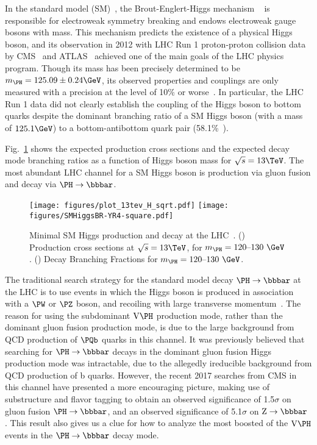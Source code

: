 
In the standard model (SM)~\cite{Salam:1961en,Glashow:1961tr,Weinberg:1967tq}, the Brout-Englert-Higgs mechanism ~\cite{PhysRevLett.13.321,PhysRevLett.13.508,PhysRevLett.13.585} is responsible for electroweak symmetry breaking and endows electroweak gauge bosons with mass. This mechanism predicts the existence of a physical Higgs boson, and its observation in 2012 with LHC Run 1 proton-proton collision data by CMS~\cite{:2012gu} and ATLAS~\cite{:2012gk} achieved one of the main goals of the LHC physics program. Though its mass has been precisely determined to be $m_\PH = 125.09 \pm 0.24 \GeV$, its observed properties and couplings are only measured with a precision at the level of 10\% or worse~\cite{CMS:2015kwa}. In particular, the LHC Run 1 data did not clearly establish the coupling of the Higgs boson to bottom quarks despite the dominant branching ratio of a SM Higgs boson (with a mass of $125.1\GeV$) to a bottom-antibottom quark pair (58.1\%~\cite{YR4}).

Fig.~\ref{fig:LHC_H} shows the expected production cross sections and the expected decay mode branching ratios as a function of Higgs boson mass for $\sqrt{s}=13\TeV$. The most abundant LHC channel for a SM Higgs boson is production via gluon fusion and decay via $\PH\to\bbbar$. 

\begin{figure}[hbtp]
  \begin{center}
    \texttt{[image: figures/plot\_13tev\_H\_sqrt.pdf]}
    \texttt{[image: figures/SMHiggsBR-YR4-square.pdf]}
    \caption{Minimal SM Higgs production and decay at the LHC~\cite{YR4}.
(\cmsLeft) Production cross sections at $\sqrt{s}=13\TeV$, for $m_\PH= 120\mbox{--}130~\GeV$. 
(\cmsRight) Decay Branching Fractions for $m_\PH= 120\mbox{--}130~\GeV$.}
    \label{fig:LHC_H}
  \end{center}
\end{figure}

The traditional search strategy for the standard model decay $\PH\to\bbbar$ at the LHC is to use events in which the Higgs boson is produced in association with a $\PW$ or $\PZ$ boson, and recoiling with large transverse momentum~\cite{Butterworth:2008iy}. The reason for using the subdominant $\PV\PH$ production mode, rather than the dominant gluon fusion production mode, is due to the large background from QCD production of $\PQb$ quarks in this channel. 
It was previously believed that searching for $\PH\to\bbbar$ decays in the dominant gluon fusion Higgs production mode was intractable, due to
the allegedly ireducible background from QCD production of b quarks.
However, the recent 2017 searches from CMS in this channel have presented a more encouraging picture, making use of substructure and flavor tagging
to obtain an observed significance of 1.5$\sigma$ on gluon fusion $\PH\to\bbbar$, and an observed significance of 5.1$\sigma$ on $\ZtoBB$ \cite{CMS-PAS-HIG-17-010}.
This result also gives us a clue for how to analyze the most boosted of the $\PV\PH$ events in the $\PH\to\bbbar$ decay mode.

